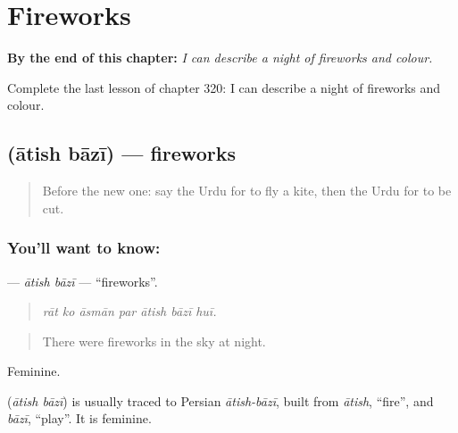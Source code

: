 
\chapter{Fireworks}
\label{ch:ur-fireworks}

\begin{chapteropening}
\textbf{By the end of this chapter:} \emph{I can describe a night of fireworks and colour.}

Complete the last lesson of chapter 320: I can describe a night of fireworks and colour.
\end{chapteropening}

\section[\texorpdfstring{\ur{آتش} \ur{بازی} (ātish bāzī)}{آتش بازی (ātish bāzī)}]{  (ātish bāzī) — fireworks}

\label{lesson:UR-C320-atish-bazi}



\begin{quote}
Before the new one: say the Urdu for to fly a kite, then the Urdu for to be cut.
\end{quote}

\subsection*{You'll want to know:  }
\textbf{ } — \emph{ātish bāzī} — \textquotedblleft{}fireworks\textquotedblright{}.

\begin{quote}
      
\end{quote}

\begin{quote}
\emph{rāt ko āsmān par ātish bāzī huī.}
\end{quote}

\begin{quote}
There were fireworks in the sky at night.
\end{quote}

Feminine.

\begin{cousinweb}
\textbf{ } (\emph{ātish bāzī}) is usually traced to Persian \emph{ātish-bāzī}, built from \emph{ātish}, \textquotedblleft{}fire\textquotedblright{}, and \emph{bāzī}, \textquotedblleft{}play\textquotedblright{}. It is feminine.
\end{cousinweb}

